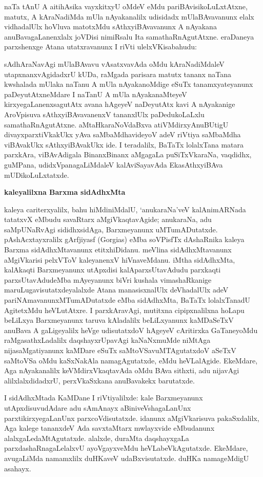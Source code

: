 naTa tAnU A aitihAsika vayxkitxyU oMdeV eMdu pariBAvisikoLuLxtAtxne, matutx, A kAraNadiMda mUla nAyakanalilx udisidadx mUlaBAvavanunx elalx vidhadalUlx hoVluva matotxMdu sAthxyiBAvavanunx A nAyakana anuBavagaLanenxlalx joVDisi nimiRsalu Ita samathaRnAgutAtxne. eraDaneya parxshenxge Atana utatxravanunx I riVti ulelxVKisabahudu:

sAdhAraNavAgi mUlaBAvavu vAsatxvavAda oMdu kAraNadiMdaleV utapxnanxvAgi\-dadxrU kUDa, raMgada parisara matutx tananx naTana kwshalada mUlaka naTanu A mUla nAyakanoMdige eSuTx tanamxyateyanunx paDeyutAtxneMdare I naTanU A mUla nAyakanaMteyeV kirxyegaLanenxsagutAtx avana hAgeyeV naDeyutAtx kavi A nAyakanige AroVpisuva sAthxyiBAvavanenxV tananxlUlx paDedukoLaLxlu samathaRnAgutAtxne. aMtaHkaraNoVdaBxva atiVMdirxyAnuBUtigU divayxparxtiVkakUkx yAva saMbaMdhavideyoV adeV riVtiya saMbaMdha viBAvakUkx sAthxyiBAvakUkx ide. I teradalilx, BaTaTx lolalxTana matara parxkAra, viBAvAdigala BinanxBinanx aMgagaLa puSiTxVkaraNa, vaqdidhx, guMPana, udidxVpanagaLiMdaleV kalAviSayavAda EkasAthxyiBAva mUDikoLuLxtatxde.

\bigskip
\begin{center}
{\Large\bf kaleyalilxna Barxma sidAdhxMta}
\end{center}

kaleya cariterxyalilx, bahu hiMdiniMdalU, `anukaraNa'veV kalAnimARNada tatatxvX eMbudu savaRtarx aMgiVkaqtavAgide; anukaraNa, adu saMpUNaRvAgi sididhxsidAga, Barxmeyanunx uMTumADutatxde. pAshAcxtayxralilx gArfjiyasf {\rm(Gorgias)} eMba soVPisfTx dAshaRnika kaleya Barxma sidAdhxMtavanunx etitxhiDidanu. meVlina sidAdhxMtavanunx aMgiVkarisi pelxVToV kaleyanenxV hiVnaveMdanu. iMtha sidAdhxMta, kalAkaqti Barxmeyanunx utApxdisi kalAparxsUtavAdudu parxkaqti parxsUtavAdudeMba mAyeyanunx biVri kushala vimashaRkanige maruLugavisutatxdeyalalxde Atana manasisxnalUlx deVhadalUlx adeV pariNAmavanunxMTumADutatxde eMba sidAdhxMta, BaTaTx lolalxTanadU AgitetxMdu heVLutAtxre. I parxkAravAgi, mutitxna cipipxnalilxna hoLapu beLiLxya Barxmeyanunx taruva kAladalilx beLiLxyanunx kaMDaSeTxV anuBava A gaLigeyalilx heVge udisutatxdoV hAgeyeV cAritirxka GaTaneyoMdu raMgasathxLadalilx daqshayxrUpavAgi kaNaNxmuMde niMtAga nijasaMgatiyanunx kaMDare eSuTx saMtoVSavuMTAgutatxdoV aSeTxV saMtoVSa oMdu kaSxNakAla namagAgutatxde, eMdu heVLalAgide. EkeMdare, Aga nAyakanalilx keVMdirxVkaqtavAda oMdu BAva sithxti, adu nijavAgi alilxlalxdidadxrU, perxVkaSxkana anuBavakekx barutatxde.

I sidAdhxMtada KaMDane I riVtiyalilxde: kale Barxmeyanunx utApxdisuvudAdare adu sAmAnayx aBiniveVshagaLanUnx parxtikirxyegaLanUnx parxcoVdisutatxde. idanunx aMgiVkarisuva pakaSxdalilx, Aga kalege tananxdeV Ada savxtaMtarx mwlayxvide eMbudanunx alalxgaLedaMtAgutatxde. alalxde, duraMta daqshayxgaLa parxdashaRnagaLelalxvU ayoVgayxveMdu heVLabeVkAgutatxde. EkeMdare, avugaLiMda namamxlilx duHKaveV udaBxvisutatxde. duHKa namageMdigU asahayx.

